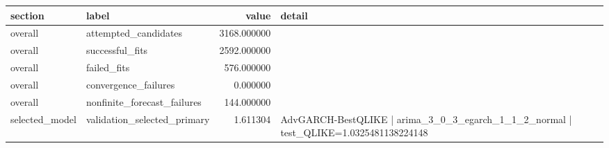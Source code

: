 \begin{tabular}{l l r l}
\hline
section & label & value & detail \\
\hline
overall & attempted\_candidates & 3168.000000 &  \\
overall & successful\_fits & 2592.000000 &  \\
overall & failed\_fits & 576.000000 &  \\
overall & convergence\_failures & 0.000000 &  \\
overall & nonfinite\_forecast\_failures & 144.000000 &  \\
selected\_model & validation\_selected\_primary & 1.611304 & AdvGARCH-BestQLIKE | arima\_3\_0\_3\_egarch\_1\_1\_2\_normal | test\_QLIKE=1.0325481138224148 \\
\hline
\end{tabular}
